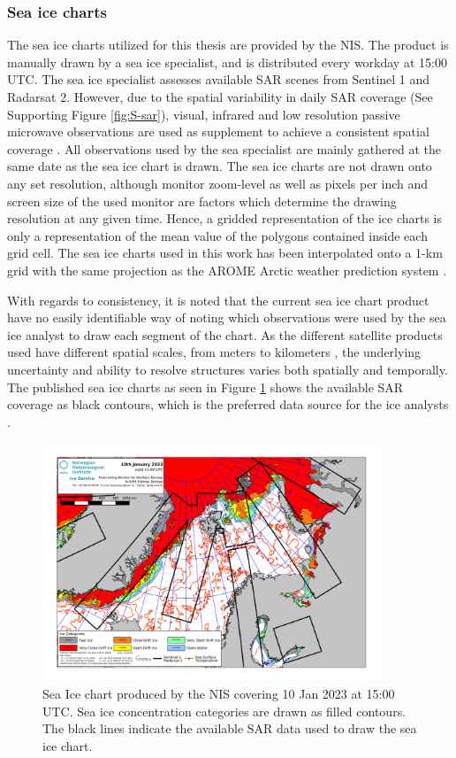 \documentclass[../main/thesis.tex]{subfiles}
\begin{document}
\subsubsection{Sea ice charts}
\label{sec:sea-ice-charts}
The sea ice charts utilized for this thesis are provided by the NIS. The product is manually drawn by a sea ice specialist, and is distributed every workday at 15:00 UTC. The sea ice specialist assesses available SAR scenes from Sentinel 1 and Radarsat 2. However, due to the spatial variability in daily SAR coverage (See Supporting Figure \ref{fig:S-sar}), visual, infrared and low resolution passive microwave observations are used as supplement to achieve a consistent spatial coverage \citep{Dinessen2020}. All observations used by the sea specialist are mainly gathered at the same date as the sea ice chart is drawn. The sea ice charts are not drawn onto any set resolution, although monitor zoom-level as well as pixels per inch and screen size of the used monitor are factors which determine the drawing resolution at any given time. Hence, a gridded representation of the ice charts is only a representation of the mean value of the polygons contained inside each grid cell. The sea ice charts used in this work has been interpolated onto a 1-km grid with the same projection as the AROME Arctic weather prediction system \citep{Mueller2017}.

With regards to consistency, it is noted that the current sea ice chart product have no easily identifiable way of noting which observations were used by the sea ice analyst to draw each segment of the chart. As the different satellite products used have different spatial scales, from meters to kilometers \citep{Dinessen2020}, the underlying uncertainty and ability to resolve structures varies both spatially and temporally. The published sea ice charts as seen in Figure \ref{fig:icechart} shows the available SAR coverage as black contours, which is the preferred data source for the ice analysts \citep{Dinessen2020}. 

\begin{figure}
    \centering
    \includegraphics[width=0.9\textwidth]{general_latest}
    \caption{\label{fig:icechart}Sea Ice chart produced by the NIS covering 10 Jan 2023 at 15:00 UTC. Sea ice concentration categories are drawn as filled contours. The black lines indicate the available SAR data used to draw the sea ice chart.}
\end{figure}
\end{document}

